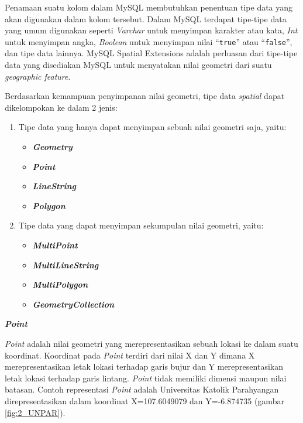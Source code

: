 \documentclass[a4paper,twoside]{article}
\begin{document}
\begin{enumerate}
\begin{itemize}
	Penamaan suatu kolom dalam MySQL membutuhkan penentuan tipe data yang akan digunakan dalam kolom tersebut. Dalam MySQL terdapat tipe-tipe data yang umum digunakan seperti \textit{Varchar} untuk menyimpan karakter atau kata, \textit{Int} untuk menyimpan angka, \textit{Boolean} untuk menyimpan nilai ``\texttt{true}'' atau ``\texttt{false}'', dan tipe data lainnya. MySQL Spatial Extensions adalah perluasan dari tipe-tipe data yang disediakan MySQL untuk menyatakan nilai geometri dari suatu \textit{geographic feature}.
	
	Berdasarkan kemampuan penyimpanan nilai geometri, tipe data \textit{spatial} dapat dikelompokan ke dalam 2 jenis:
\begin{enumerate}
	\item Tipe data yang hanya dapat menyimpan sebuah nilai geometri saja, yaitu:
	\begin{itemize}
		\item \textbf{\textit{Geometry}}
		\item \textbf{\textit{Point}}
		\item \textbf{\textit{LineString}}
		\item \textbf{\textit{Polygon}}
	\end{itemize}
	\item Tipe data yang dapat menyimpan sekumpulan nilai geometri, yaitu:
	\begin{itemize}
		\item \textbf{\textit{MultiPoint}}
		\item \textbf{\textit{MultiLineString}}
		\item \textbf{\textit{MultiPolygon}}
		\item \textbf{\textit{GeometryCollection}}
	\end{itemize}
\end{enumerate}

\textbf{\textit{Point}}

\textit{Point} adalah nilai geometri yang merepresentasikan sebuah lokasi ke dalam suatu koordinat\cite{mysqlspatial}. Koordinat pada \textit{Point} terdiri dari nilai X dan Y dimana X merepresentasikan letak lokasi terhadap garis bujur dan Y merepresentasikan letak lokasi terhadap garis lintang. \textit{Point} tidak memiliki dimensi maupun nilai batasan. Contoh representasi \textit{Point} adalah Universitas Katolik Parahyangan direpresentasikan dalam koordinat X=107.6049079 dan Y=-6.874735 (gambar \ref{fig:2_UNPAR}).


\end{itemize}
\end{enumerate}
\end{document}
